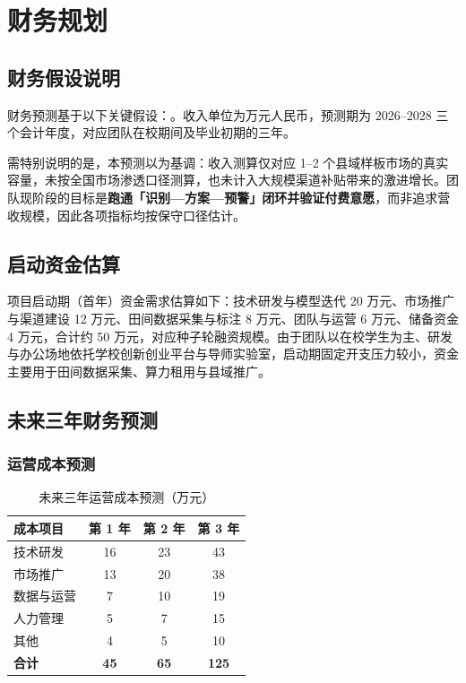 \chapter{财务规划}

\section{财务假设说明}

财务预测基于以下关键假设：。收入单位为万元人民币，预测期为 2026--2028 三个会计年度，对应团队在校期间及毕业初期的三年。

需特别说明的是，本预测以为基调：收入测算仅对应 1--2 个县域样板市场的真实容量，未按全国市场渗透口径测算，也未计入大规模渠道补贴带来的激进增长。团队现阶段的目标是\textbf{跑通「识别—方案—预警」闭环并验证付费意愿}，而非追求营收规模，因此各项指标均按保守口径估计。

\section{启动资金估算}

项目启动期（首年）资金需求估算如下：技术研发与模型迭代 20 万元、市场推广与渠道建设 12 万元、田间数据采集与标注 8 万元、团队与运营 6 万元、储备资金 4 万元，合计约 50 万元，对应种子轮融资规模。由于团队以在校学生为主、研发与办公场地依托学校创新创业平台与导师实验室，启动期固定开支压力较小，资金主要用于田间数据采集、算力租用与县域推广。

\section{未来三年财务预测}

\subsection{运营成本预测}

\begin{table}[H]
  \centering
  \small
  \renewcommand{\arraystretch}{1.25}
  \caption{未来三年运营成本预测（万元）}
  \begin{tabular}{lccc}
    \toprule
    成本项目 & 第 1 年 & 第 2 年 & 第 3 年 \\
    \midrule
    技术研发 & 16 & 23 & 43 \\
    市场推广 & 13 & 20 & 38 \\
    数据与运营 & 7 & 10 & 19 \\
    人力管理 & 5 & 7 & 15 \\
    其他 & 4 & 5 & 10 \\
    \midrule
    \textbf{合计} & \textbf{45} & \textbf{65} & \textbf{125} \\
    \bottomrule
  \end{tabular}
\end{table}

